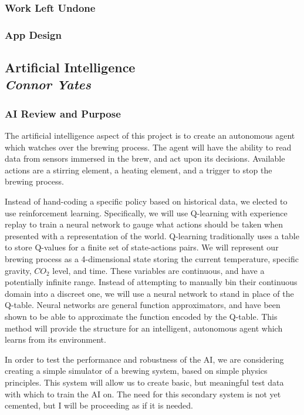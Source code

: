\documentclass[draftclsnofoot,onecolumn,letterpaper,10pt]{IEEEtran}
\begin{document}
\vfill
\clearpage
\subsubsection{Work Left Undone}

\subsubsection{App Design}


\subsection{Artificial Intelligence\\{\em\textbf{Connor Yates}}}
\subsubsection{AI Review and Purpose}
The artificial intelligence aspect of this project is to create an autonomous agent which watches over the brewing process.
The agent will have the ability to read data from sensors immersed in the brew, and act upon its decisions.
Available actions are a stirring element, a heating element, and a trigger to stop the brewing process.

Instead of hand-coding a specific policy based on historical data, we elected to use reinforcement learning.
Specifically, we will use Q-learning with experience replay to train a neural network to gauge what actions should be taken when presented with a representation of the world.
Q-learning traditionally uses a table to store Q-values for a finite set of state-actions pairs.
We will represent our brewing process as a 4-dimensional state storing the current temperature, specific gravity, $CO_2$ level, and time.
These variables are continuous, and have a potentially infinite range.
Instead of attempting to manually bin their continuous domain into a discreet one, we will use a neural network to stand in place of the Q-table.
Neural networks are general function approximators, and have been shown to be able to approximate the function encoded by the Q-table.
This method will provide the structure for an intelligent, autonomous agent which learns from its environment.

In order to test the performance and robustness of the AI, we are considering creating a simple simulator of a brewing system, based on simple physics principles.
This system will allow us to create basic, but meaningful test data with which to train the AI on.
The need for this secondary system is not yet cemented, but I will be proceeding as if it is needed.
\end{document}
